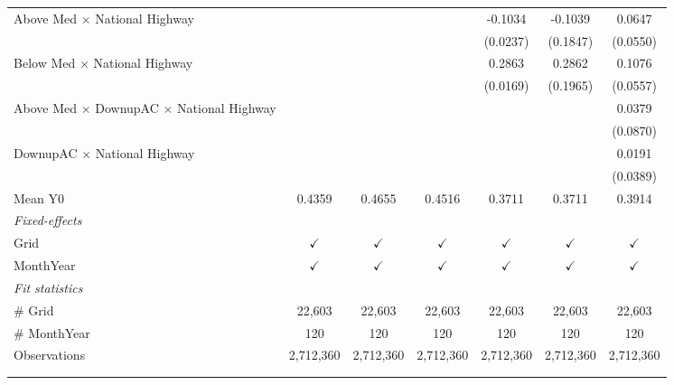 \begin{table}[htbp]
\begin{tabular}{lcccccc}
      Above Med $\times$ National Highway                     &               &               &               & -0.1034       & -0.1039       & 0.0647\\   
                                                              &               &               &               & (0.0237)      & (0.1847)      & (0.0550)\\   
      Below Med $\times$ National Highway                     &               &               &               & 0.2863        & 0.2862        & 0.1076\\   
                                                              &               &               &               & (0.0169)      & (0.1965)      & (0.0557)\\   
      Above Med $\times$ DownupAC $\times$ National Highway   &               &               &               &               &               & 0.0379\\   
                                                              &               &               &               &               &               & (0.0870)\\   
      DownupAC $\times$ National Highway                      &               &               &               &               &               & 0.0191\\   
                                                              &               &               &               &               &               & (0.0389)\\   
      \hline Mean Y0                                          & 0.4359        & 0.4655        & 0.4516        & 0.3711        & 0.3711        & 0.3914\\  
      \midrule
      \emph{Fixed-effects}\\
      Grid                                                    & $\checkmark$  & $\checkmark$  & $\checkmark$  & $\checkmark$  & $\checkmark$  & $\checkmark$\\   
      MonthYear                                               & $\checkmark$  & $\checkmark$  & $\checkmark$  & $\checkmark$  & $\checkmark$  & $\checkmark$\\   
      \midrule
      \emph{Fit statistics}\\
      \# Grid                                                 & 22,603        & 22,603        & 22,603        & 22,603        & 22,603        & 22,603\\  
      \# MonthYear                                            & 120           & 120           & 120           & 120           & 120           & 120\\  
      Observations                                            & 2,712,360     & 2,712,360     & 2,712,360     & 2,712,360     & 2,712,360     & 2,712,360\\  
      \midrule \midrule
                                                              &               &               &               &               &               &  \tabularnewline 
      \\
   \end{tabular}
\end{table}


